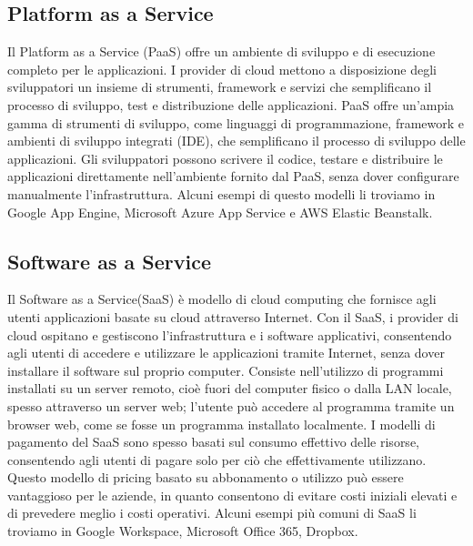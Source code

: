 \documentclass[../main.tex]{subfiles}
\begin{document}
\subsection{Platform as a Service}
Il Platform as a Service (PaaS) offre un ambiente di sviluppo e di esecuzione completo per le applicazioni. I provider di cloud mettono a disposizione degli sviluppatori un insieme di strumenti, framework e servizi che semplificano il processo di sviluppo, test e distribuzione delle applicazioni.
PaaS offre un'ampia gamma di strumenti di sviluppo, come linguaggi di programmazione, framework e ambienti di sviluppo integrati (IDE), che semplificano il processo di sviluppo delle applicazioni. Gli sviluppatori possono scrivere il codice, testare e distribuire le applicazioni direttamente nell'ambiente fornito dal PaaS, senza dover configurare manualmente l'infrastruttura.
Alcuni esempi di questo modelli li troviamo in Google App Engine, Microsoft Azure App Service e AWS Elastic Beanstalk.

\subsection{Software as a Service}
Il Software as a Service(SaaS) è modello di cloud computing che fornisce agli utenti applicazioni basate su cloud attraverso Internet. Con il SaaS, i provider di cloud ospitano e gestiscono l'infrastruttura e i software applicativi, consentendo agli utenti di accedere e utilizzare le applicazioni tramite Internet, senza dover installare il software sul proprio computer.
Consiste nell'utilizzo di programmi installati su un server remoto, cioè fuori del computer fisico o dalla LAN locale, spesso attraverso un server web; l'utente può accedere al programma tramite un browser web, come se fosse un programma installato localmente.
I modelli di pagamento del SaaS sono spesso basati sul consumo effettivo delle risorse, consentendo agli utenti di pagare solo per ciò che effettivamente utilizzano. Questo modello di pricing basato su abbonamento o utilizzo può essere vantaggioso per le aziende, in quanto consentono di evitare costi iniziali elevati e di prevedere meglio i costi operativi.
Alcuni esempi più comuni di SaaS li troviamo in Google Workspace, Microsoft Office 365, Dropbox.
\end{document}
